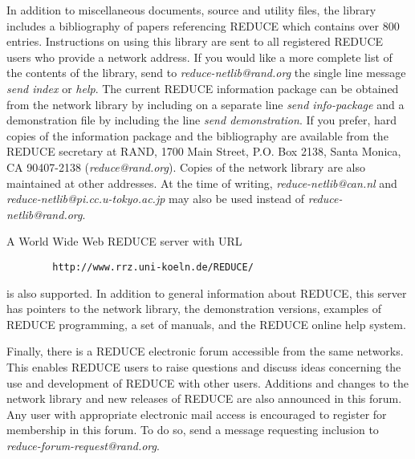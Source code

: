 \documentclass[11pt,letterpaper]{book}
\newcommand{\REDUCE}{REDUCE}
\newcommand{\meta}[1]{\mbox{$\langle$\it#1\/$\rangle$}}
\begin{document}
In addition to miscellaneous documents, source and utility files, the
library includes a bibliography of papers referencing {\REDUCE} which
contains over 800 entries.  Instructions on using this library are sent to
all registered {\REDUCE} users who provide a network address.  If you
would like a more complete list of the contents of the library, send to
{\em reduce-netlib@rand.org\/} the single line message {\em send index\/} or
{\em help}. The current {\REDUCE} information
package can be obtained from the network library by including on a
separate line {\em send info-package\/} and a demonstration file by
including the line {\em send demonstration}.  If you prefer, hard copies
of the information package and the bibliography are available from the
{\REDUCE} secretary at RAND, 1700 Main Street, P.O. Box 2138, Santa
Monica, CA 90407-2138 ({\em reduce@rand.org}).  Copies of the network
library are also maintained at other addresses.  At the time of writing,
{\em reduce-netlib@can.nl\/} and {\em reduce-netlib@pi.cc.u-tokyo.ac.jp\/}
may also be used instead of {\em reduce-netlib@rand.org}.

A World Wide Web {\REDUCE} server with URL
{\small\begin{verbatim}
        http://www.rrz.uni-koeln.de/REDUCE/
\end{verbatim}}
is also supported.  In addition to general information about {\REDUCE}, this
server has pointers to the network library, the demonstration versions,
examples of {\REDUCE} programming, a set of manuals, and the {\REDUCE} online
help system.

Finally, there is a {\REDUCE} electronic forum accessible from the same
networks.  This enables {\REDUCE} users to raise questions and discuss
ideas concerning the use and development of {\REDUCE} with other users.
Additions and changes to the network library and new releases of {\REDUCE}
are also announced in this forum.  Any user with appropriate electronic
mail access is encouraged to register for membership in this forum.  To do
so, send a message requesting inclusion to \\
{\em reduce-forum-request@rand.org}.


\newcommand{\s}[1] {$<${\em #1}$>$}

\end{document}
